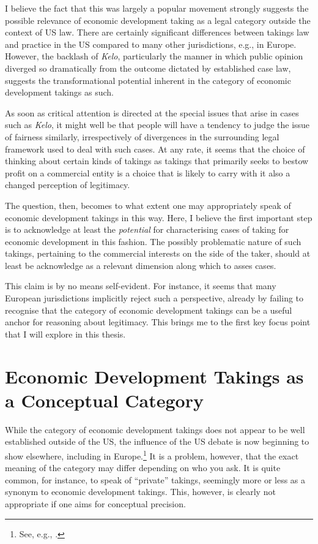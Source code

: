 I believe the fact that this was largely a popular movement strongly suggests the possible relevance of economic development taking as a legal category outside the context of US law. There are certainly significant differences between takings law and practice in the US compared to many other jurisdictions, e.g., in Europe. However, the backlash of {\it Kelo}, particularly the manner in which public opinion diverged so dramatically from the outcome dictated by established case law, suggests the transformational potential inherent in the category of economic development takings as such.

As soon as critical attention is directed at the special issues that arise in cases such as {\it Kelo}, it might well be that people will have a tendency to judge the issue of fairness similarly, irrespectively of divergences in the surrounding legal framework used to deal with such cases. At any rate, it seems that the choice of thinking about certain kinds of takings as takings that primarily seeks to bestow profit on a commercial entity is a choice that is likely to carry with it also a changed perception of legitimacy.

The question, then, becomes to what extent one may appropriately speak of economic development takings in this way. Here, I believe the first important step is to acknowledge at least the {\it potential} for characterising cases of taking for economic development in this fashion. The possibly problematic nature of such takings, pertaining to the commercial interests on the side of the taker, should at least be acknowledge as a relevant dimension along which to asses cases.

This claim is by no means self-evident. For instance, it seems that many European jurisdictions implicitly reject such a perspective, already by failing to recognise that the category of economic development takings can be a useful anchor for reasoning about legitimacy. This brings me to the first key focus point that I will explore in this thesis.

\section{Economic Development Takings as a Conceptual Category}

While the category of economic development takings does not appear to be well established outside of the US, the influence of the US debate is now beginning to show elsewhere, including in Europe.\footnote{See, e.g., \cite{verstappen14}.} It is a problem, however, that the exact meaning of the category may differ depending on who you ask. It is quite common, for instance, to speak of ``private'' takings, seemingly more or less as a synonym to economic development takings. This, however, is clearly not appropriate if one aims for conceptual precision.

